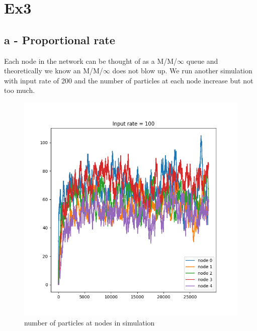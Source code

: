 \documentclass{article}
\begin{document}
\section{Ex3}
\subsection{a - Proportional rate}
Each node in the network can be thought of as a M/M/$\infty$ queue and theoretically we know an M/M/$\infty$ does not blow up. We run another simulation
with input rate of 200 and the number of particles at each node increase but not too much.
\begin{figure}[!htbp]
    \centering
    \includegraphics[width=\linewidth]{fig/proportional_100}   
    \caption{number of particles at nodes in simulation}
    \label{fig:figure5}
\end{figure}
\end{document}
